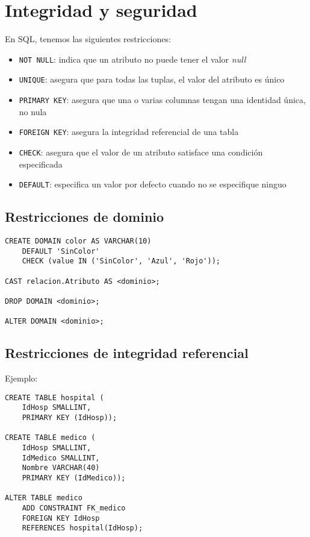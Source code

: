 \documentclass[a4paper, twoside]{article}
\begin{document}
\section{Integridad y seguridad}

En SQL, tenemos las siguientes restricciones:
\begin{itemize}
\item \texttt{NOT NULL}: indica que un atributo no puede tener el valor
\emph{null}
\item \texttt{UNIQUE}: asegura que para todas las tuplas, el valor del atributo
es único
\item \texttt{PRIMARY KEY}: asegura que una o varias columnas tengan una
identidad única, no nula
\item \texttt{FOREIGN KEY}: asegura la integridad referencial de una tabla
\item \texttt{CHECK}: asegura que el valor de un atributo satisface una
condición especificada
\item \texttt{DEFAULT}: especifica un valor por defecto cuando no se especifique
ninguo
\end{itemize}

\subsection{Restricciones de dominio}

\begin{lstlisting}
CREATE DOMAIN color AS VARCHAR(10)
	DEFAULT 'SinColor'
	CHECK (value IN ('SinColor', 'Azul', 'Rojo'));

CAST relacion.Atributo AS <dominio>;

DROP DOMAIN <dominio>;

ALTER DOMAIN <dominio>;
\end{lstlisting}



\subsection{Restricciones de integridad referencial}

Ejemplo: 

\begin{lstlisting}
CREATE TABLE hospital (
	IdHosp SMALLINT,
	PRIMARY KEY (IdHosp));

CREATE TABLE medico (
	IdHosp SMALLINT,
	IdMedico SMALLINT,
	Nombre VARCHAR(40)
	PRIMARY KEY (IdMedico));

ALTER TABLE medico
	ADD CONSTRAINT FK_medico 
	FOREIGN KEY IdHosp 
	REFERENCES hospital(IdHosp);
\end{lstlisting}
\end{document}
